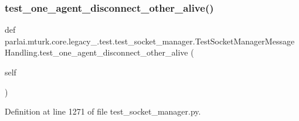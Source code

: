 \subsubsection{\texorpdfstring{test\+\_\+one\+\_\+agent\+\_\+disconnect\+\_\+other\+\_\+alive()}{test\_one\_agent\_disconnect\_other\_alive()}}
{\footnotesize\ttfamily def parlai.\+mturk.\+core.\+legacy\+\_.\+test.\+test\+\_\+socket\+\_\+manager.\+Test\+Socket\+Manager\+Message\+Handling.\+test\+\_\+one\+\_\+agent\+\_\+disconnect\+\_\+other\+\_\+alive (\begin{DoxyParamCaption}\item[{}]{self }\end{DoxyParamCaption})}



Definition at line 1271 of file test\+\_\+socket\+\_\+manager.\+py.


